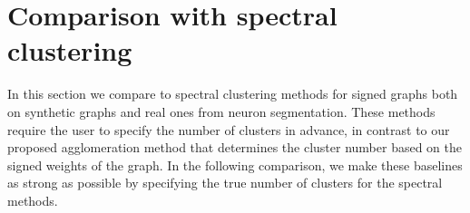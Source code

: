 






\section{Comparison with spectral clustering} 
In this section we compare \algname{} to spectral clustering methods for signed graphs both on synthetic graphs and real ones from neuron segmentation. These methods \cite{Cucuringu2019SPONGEAG,chiang2012scalable,kunegis2010spectral} require the user to specify the number of clusters in advance, in contrast to our proposed agglomeration method that determines the cluster number based on the signed weights of the graph. In the following comparison, we make these baselines as strong as possible by specifying the true number of clusters for the spectral methods.

